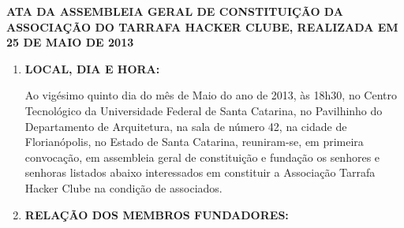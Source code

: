 \documentclass[a4paper]{report}
\begin{document}
\begin{center}
 \textbf{\MakeTextUppercase{Ata da Assembleia Geral de Constituição da
                            Associação do Tarrafa Hacker Clube,
                            realizada em 25 de Maio de 2013}}
\end{center}

\begin{enumerate}
\item \textbf{LOCAL, DIA E HORA:}

      Ao vigésimo quinto dia do mês de Maio do ano de 2013, às 18h30,
      no Centro Tecnológico da Universidade Federal de Santa Catarina,
      no Pavilhinho do Departamento de Arquitetura, na sala de número 42,
      na cidade de Florianópolis, no Estado de Santa Catarina,
      reuniram-se, em primeira convocação, em assembleia geral de constituição
      e fundação os senhores e senhoras listados abaixo interessados em
      constituir a Associação Tarrafa Hacker Clube na condição de associados.

\item \textbf{RELAÇÃO DOS MEMBROS FUNDADORES:}


\end{enumerate}
\end{document}
